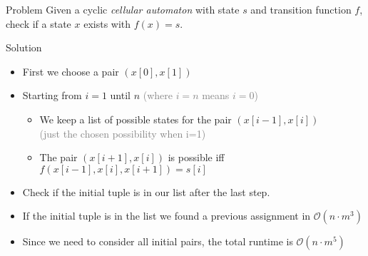 \begin{slide}
	\begin{block}{Problem}
		Given a cyclic \emph{cellular automaton} with state $s$ and transition function $f$, check if a state $x$ exists with $f(x)=s$.
	\end{block}
	\pause
	\begin{block}{Solution}
		\begin{itemize}
			\item First we choose a pair $(x[0],x[1])$
			\item Starting from $i=1$ until $n$ \textcolor{gray}{(where $i = n$ means $i = 0$)}
			\begin{itemize}
				\item We keep a list of possible states for the pair $(x[i-1], x[i])$\\\textcolor{gray}{(just the chosen possibility when i=1)}
				\item The pair $(x[i+1], x[i])$ is possible iff $f(x[i-1], x[i], x[i+1])=s[i]$
			\end{itemize}
			\item Check if the initial tuple is in our list after the last step.
			\medskip
			\pause
			\item If the initial tuple is in the list we found a previous assignment in $\mathcal{O}(n\cdot{}m^3)$
			\pause
			\item Since we need to consider all initial pairs, the total runtime is $\mathcal{O}(n\cdot{}m^5)$
		\end{itemize}
	\end{block}
\end{slide}
